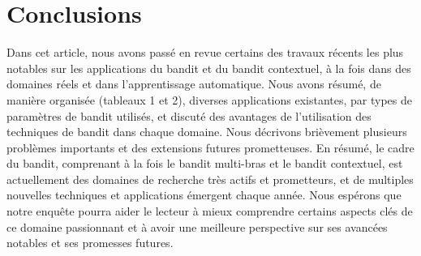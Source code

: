 \documentclass[conference]{IEEEtran}
\newcommand{\1}[1]{\mathbbm{1}_{\left\{#1\right\}}}
\begin{document}
 \section{Conclusions}
\label{sec:Conclusion}
Dans cet article, nous avons passé en revue certains des travaux récents les plus notables sur les applications du bandit et du bandit contextuel, à la fois dans des domaines réels et dans l'apprentissage automatique. Nous avons résumé, de manière organisée (tableaux 1 et 2), diverses applications existantes, par types de paramètres de bandit utilisés, et discuté des avantages de l'utilisation des techniques de bandit dans chaque domaine. Nous décrivons brièvement plusieurs problèmes importants et des extensions futures prometteuses.
En résumé, le cadre du bandit, comprenant à la fois le bandit multi-bras et le bandit contextuel, est actuellement des domaines de recherche très actifs et prometteurs, et de multiples nouvelles techniques et applications émergent chaque année. Nous espérons que notre enquête pourra aider le lecteur à mieux comprendre certains aspects clés de ce domaine passionnant et à avoir une meilleure perspective sur ses avancées notables et ses promesses futures.



\end{document}

